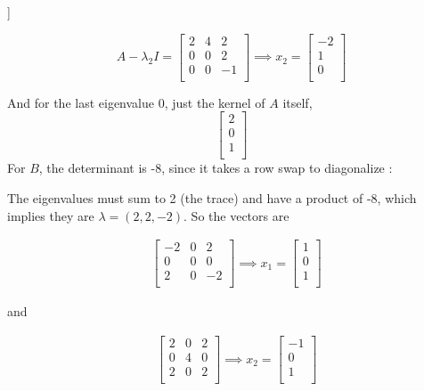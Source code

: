 \documentclass[
]{article}
\begin{document}
{]}

\[A - \lambda_2I = \begin{bmatrix}
  2 & 4 & 2\\
  0 & 0 & 2\\
  0 & 0 & -1\\
\end{bmatrix} \implies x_2 = \begin{bmatrix}
  -2\\
  1\\
  0\\
\end{bmatrix}\]

And for the last eigenvalue 0, just the kernel of \(A\) itself,
\[\begin{bmatrix}
  2\\
  0\\
  1\\
\end{bmatrix}
\] For \(B\), the determinant is -8, since it takes a row swap to
diagonalize :

The eigenvalues must sum to 2 (the trace) and have a product of -8,
which implies they are \(\lambda = (2, 2, -2)\). So the vectors are

\[
  \begin{aligned}
    & \begin{bmatrix}
      -2 & 0 & 2\\
      0 & 0 & 0\\
      2 & 0 & -2\\
    \end{bmatrix} \implies x_1 = \begin{bmatrix}
      1\\
      0\\
      1\\
    \end{bmatrix}
  \end{aligned}
\]

and

\[
  \begin{aligned}
    & \begin{bmatrix}
      2 & 0 & 2\\
      0 & 4 & 0\\
      2 & 0 & 2\\
    \end{bmatrix} \implies x_2 = \begin{bmatrix}
      -1\\
      0\\
      1\\
    \end{bmatrix}
  \end{aligned}
\]
\end{document}
